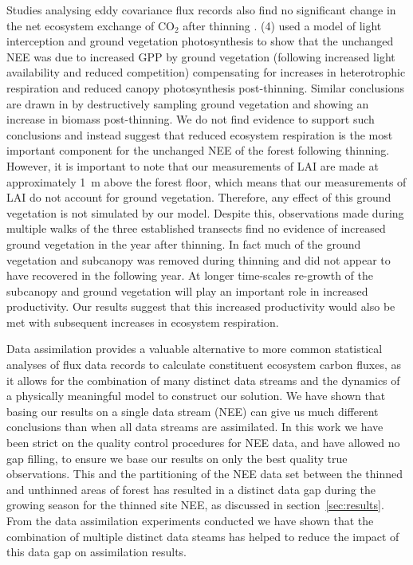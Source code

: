 \documentclass[draft,linenumbers]{agujournal}
\begin{document}
Studies analysing eddy covariance flux records also find no significant change in the net ecosystem exchange of CO\(_{2}\) after thinning \citep{vesala2005effect, moreaux2011paired, dore2012recovery, wilkinson2016}. {\color{blue}(4) \citet{vesala2005effect} used a model of light interception and ground vegetation photosynthesis to show that the unchanged NEE was due to increased GPP by ground vegetation (following increased light availability and reduced competition) compensating for increases in heterotrophic respiration and reduced canopy photosynthesis post-thinning. Similar conclusions are drawn in \citet{moreaux2011paired} by destructively sampling ground vegetation and showing an increase in biomass post-thinning}. We do not find evidence to support such conclusions and instead suggest that reduced ecosystem respiration is the most important component for the unchanged NEE of the forest following thinning. However, it is important to note that our measurements of LAI are made at approximately 1~m above the forest floor, which means that our measurements of LAI do not account for ground vegetation. Therefore, any effect of this ground vegetation is not simulated by our model. Despite this, observations made during multiple walks of the three established transects find no evidence of increased ground vegetation in the year after thinning. In fact much of the ground vegetation and subcanopy was removed during thinning and did not appear to have recovered in the following year. At longer time-scales re-growth of the subcanopy and ground vegetation will play an important role in increased productivity. Our results suggest that this increased productivity would also be met with subsequent increases in ecosystem respiration.

{\color{blue}Data assimilation provides a valuable alternative to more common statistical analyses of flux data records to calculate constituent ecosystem carbon fluxes, as it allows for the combination of many distinct data streams and the dynamics of a physically meaningful model to construct our solution. We have shown that basing our results on a single data stream (NEE) can give us much different conclusions than when all data streams are assimilated. In this work we have been strict on the quality control procedures for NEE data, and have allowed no gap filling, to ensure we base our results on only the best quality true observations. This and the partitioning of the NEE data set between the thinned and unthinned areas of forest has resulted in a distinct data gap during the growing season for the thinned site NEE, as discussed in section~\ref{sec:results}. From the data assimilation experiments conducted we have shown that the combination of multiple distinct data steams has helped to reduce the impact of this data gap on assimilation results. }  
\end{document}
